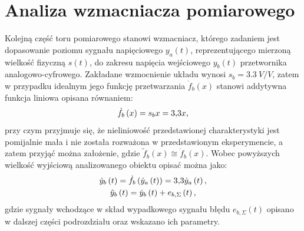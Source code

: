 \section{Analiza wzmacniacza pomiarowego}

Kolejną część toru pomiarowego stanowi wzmacniacz, którego zadaniem jest dopasowanie poziomu sygnału napięciowego $y_{a}(t)$, reprezentującego mierzoną wielkość fizyczną $s(t)$, do zakresu napięcia wejściowego $y_{b}(t)$ przetwornika analogowo-cyfrowego. Zakładane wzmocnienie układu wynosi $s_{b} = \qty{3.3}{V \per V}$, zatem w przypadku idealnym jego funkcję przetwarzania $\dot{f}_{b}(x)$ stanowi addytywna funkcja liniowa opisana równaniem:
\begin{equation}
\dot{f}_{b} \left(x\right) = s_{b} x = \num{3.3} x \label{eq:sym_partb_function},
\end{equation}
przy czym przyjmuje się, że nieliniowość przedstawionej charakterystyki jest pomijalnie mała i nie została rozważona w przedstawionym eksperymencie, a zatem przyjąć można założenie, gdzie $\tilde{f}_{b}(x) \cong \dot{f}_{b}(x)$. Wobec powyższych wielkość wyjściową analizowanego obiektu opisać można jako:
\begin{gather}
\dot{y}_{b} \left(t\right) = \dot{f}_{b} \left(\dot{y}_{a} \left(t\right)\right) = \num{3.3} \dot{y}_{a} \left(t\right) \label{eq:sym_partb_out_ideal}, \\
\tilde{y}_{b} \left(t\right) = \dot{y}_{b} \left(t\right) + e_{b,\Sigma} \left(t\right) \label{eq:sym_partb_out_real},
\end{gather}
gdzie sygnały wchodzące w skład wypadkowego sygnału błędu $e_{b,\Sigma}(t)$ opisano w dalszej części podrozdziału oraz wskazano ich parametry.


